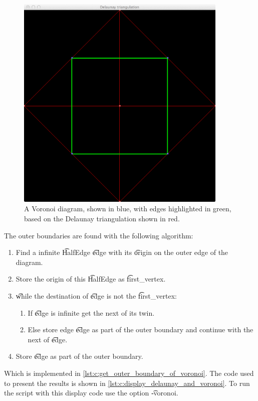 \begin{figure}
\begin{minipage}[t]{0.45\textwidth}
		\includegraphics[width=0.9\textwidth]{./img/c_small_triangulation}
		\caption{A Voronoi diagram, shown in blue, with edges highlighted in green, based on the Delaunay triangulation shown in red.}
		\label{fig:c:voronoi_small}		
	\end{minipage}
\end{figure}

The outer boundaries are found with the following algorithm:
	\begin{enumerate}
		\item Find a infinite \t{HalfEdge} \t{edge} with its \t{origin} on the outer edge of the diagram.
		\item Store the origin of this \t{HalfEdge} as \t{first_vertex}.
		\item \t{while} the destination of \t{edge} is not the \t{first_vertex}:
			\begin{enumerate}
				\item If \t{edge} is infinite get the next of its twin.
				\item Else store edge \t{edge} as part of the outer boundary and continue with the next of \t{edge}.
			\end{enumerate}
		\item Store \t{edge} as part of the outer boundary.
	\end{enumerate}

Which is implemented in \autoref{lst:c:get_outer_boundary_of_voronoi}. The code used to present the results is shown in \autoref{lst:c:display_delaunay_and_voronoi}. To run the script with this display code use the option \t{-voronoi}.





